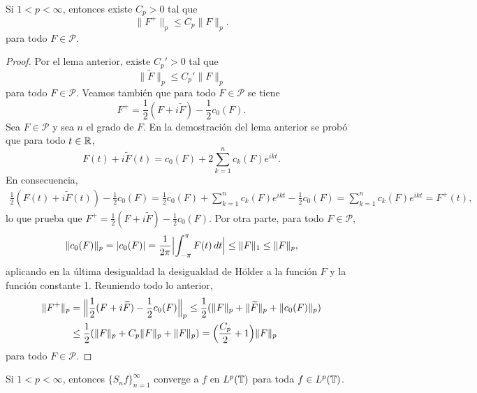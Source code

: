 \documentclass[a4paper, 12pt, oneside]{book}
\begin{document}
\begin{lemma}
    Si $1 < p < \infty$, entonces existe $C_p > 0$ tal que
    \[\|F^+\|_p \leq C_p \|F\|_{p}.\]
    para todo $F \in \mathcal{P}$.
\end{lemma}

\begin{proof}
    Por el lema anterior, existe $C_p'>0$ tal que
    \[\|\widetilde{F}\|_p\leq C_p' \|F\|_p\]
    para todo $F \in \mathcal{P}$. Veamos también que para todo $F \in \mathcal{P}$ se tiene
    \[F^+ = \frac{1}{2}(F+i\widetilde{F})-\frac{1}{2}c_0(F).\] 
    Sea $F\in\mathcal{P}$ y sea $n$ el grado de $F$. En la demostración del lema anterior se probó que para todo $t\in\mathbb R$,
    \[F(t)+i\widetilde{F}(t) = c_0(F)+2\sum_{k=1}^n c_k(F)e^{ikt}.\]
    En consecuencia,
    \begin{align*}
        \frac{1}{2}(F(t)+i\widetilde{F}(t))-\frac{1}{2}c_0(F) = \frac{1}{2}c_0(F)+\sum_{k=1}^n c_k(F)e^{ikt}-\frac{1}{2}c_0(F) = \sum_{k=1}^n c_k(F)e^{ikt} = F^+(t),
    \end{align*}
    lo que prueba que $F^+=\frac{1}{2}(F+i\widetilde{F})-\frac{1}{2}c_0(F)$. Por otra parte, para todo $F\in\mathcal{P}$,
    \[\|c_0(F)\|_p = |c_0(F)| = \frac{1}{2\pi}\Bigl|\int_{-\pi}^{\pi} F(t) \, dt\Bigr| \leq \|F\|_1\leq \|F\|_p,\]
    aplicando en la última desigualdad la desigualdad de Hölder a la función $F$ y la función constante 1. Reuniendo todo lo anterior,
    \begin{align*}
        \|F^+\|_p &= \Bigl\|\frac{1}{2}(F+i\widetilde{F})-\frac{1}{2}c_0(F)\Bigr\|_p \leq \frac{1}{2}(\|F\|_p+\|\widetilde{F}\|_p+\|c_0(F)\|_p) \\ 
        &\leq \frac{1}{2}(\|F\|_p+C_p\|F\|_p+\|F\|_p) = \Bigl(\frac{C_p}{2}+1\Bigr)\|F\|_p
    \end{align*}
    para todo $F\in\mathcal{P}$.
\end{proof}

\begin{theorem}
    Si $1 < p < \infty$, entonces $\{S_nf\}_{n=1}^\infty$ converge a $f$ en $L^p(\mathbb T)$ para toda $f \in L^p(\mathbb T)$.
\end{theorem}
\end{document}

